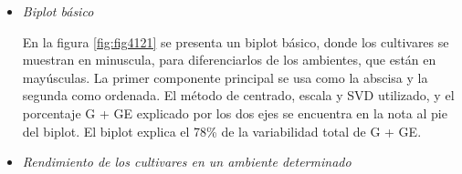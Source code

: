 \begin{itemize}[wide, nosep, labelindent = 0pt, topsep = 1ex, noitemsep,topsep=0pt]
\item \emph{Biplot básico}

En la figura \ref{fig:fig4121} se presenta un biplot básico, donde los cultivares se muestran en minuscula, para diferenciarlos de los ambientes, que están en mayúsculas. La primer componente principal se usa como la abscisa y la segunda como ordenada. El método de centrado, escala y SVD utilizado, y el porcentaje G + GE explicado por los dos ejes se encuentra en la nota al pie del biplot. El biplot explica el 78\% de la variabilidad total de G + GE.


\item \emph{Rendimiento de los cultivares en un ambiente determinado}


\end{itemize}
